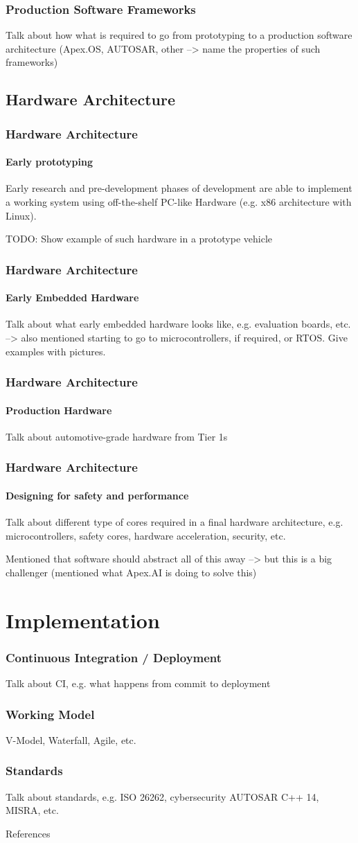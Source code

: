 \documentclass{beamer}
\begin{document}
\begin{frame}
\frametitle{Production Software Frameworks}
Talk about how what is required to go from prototyping to a production
software architecture (Apex.OS, AUTOSAR, other --> name the properties
of such frameworks)
\end{frame}

\subsection{Hardware Architecture}

\begin{frame}
\frametitle{Hardware Architecture}
\framesubtitle{Early prototyping}
Early research and pre-development phases of development are able to
implement a working system using off-the-shelf PC-like Hardware
(e.g. x86 architecture with Linux).

TODO: Show example of such hardware in a prototype vehicle
\end{frame}

\begin{frame}
\frametitle{Hardware Architecture}
\framesubtitle{Early Embedded Hardware}
Talk about what early embedded hardware looks like, e.g. evaluation boards,
etc. --> also mentioned starting to go to microcontrollers, if required, or
RTOS. Give examples with pictures.
\end{frame}

\begin{frame}
\frametitle{Hardware Architecture}
\framesubtitle{Production Hardware}
Talk about automotive-grade hardware from Tier 1s
\end{frame}

\begin{frame}
\frametitle{Hardware Architecture}
\framesubtitle{Designing for safety and performance}
Talk about different type of cores required in a final hardware architecture,
e.g. microcontrollers, safety cores, hardware acceleration, security, etc.

Mentioned that software should abstract all of this away --> but this is a big
challenger (mentioned what Apex.AI is doing to solve this)
\end{frame}

\section{Implementation}

\begin{frame}
\frametitle{Continuous Integration / Deployment}
Talk about CI, e.g. what happens from commit to deployment
\end{frame}

\begin{frame}
\frametitle{Working Model}
V-Model, Waterfall, Agile, etc.
\end{frame}

\begin{frame}
\frametitle{Standards}
Talk about standards, e.g. ISO 26262, cybersecurity AUTOSAR C++ 14, MISRA, etc.
\end{frame}

\begin{frame}[allowframebreaks]{References}
\printbibliography
\end{frame}
\end{document}
